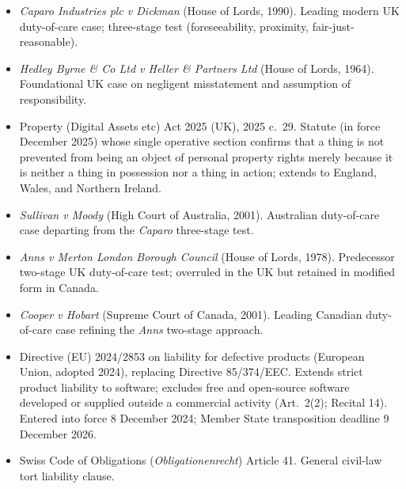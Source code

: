 \documentclass[11pt, twoside, openright]{book}
\begin{document}
\begin{itemize}[leftmargin=1.5em, itemsep=4pt]
  \item \textit{Caparo Industries plc v Dickman} (House of Lords, 1990). Leading modern UK duty-of-care case; three-stage test (foreseeability, proximity, fair-just-reasonable).
  \item \textit{Hedley Byrne \& Co Ltd v Heller \& Partners Ltd} (House of Lords, 1964). Foundational UK case on negligent misstatement and assumption of responsibility.
  \item Property (Digital Assets etc) Act 2025 (UK), 2025 c.~29. Statute (in force December 2025) whose single operative section confirms that a thing is not prevented from being an object of personal property rights merely because it is neither a thing in possession nor a thing in action; extends to England, Wales, and Northern Ireland.
  \item \textit{Sullivan v Moody} (High Court of Australia, 2001). Australian duty-of-care case departing from the \textit{Caparo} three-stage test.
  \item \textit{Anns v Merton London Borough Council} (House of Lords, 1978). Predecessor two-stage UK duty-of-care test; overruled in the UK but retained in modified form in Canada.
  \item \textit{Cooper v Hobart} (Supreme Court of Canada, 2001). Leading Canadian duty-of-care case refining the \textit{Anns} two-stage approach.
  \item Directive (EU) 2024/2853 on liability for defective products (European Union, adopted 2024), replacing Directive 85/374/EEC. Extends strict product liability to software; excludes free and open-source software developed or supplied outside a commercial activity (Art.~2(2); Recital 14). Entered into force 8 December 2024; Member State transposition deadline 9 December 2026.
  \item Swiss Code of Obligations (\textit{Obligationenrecht}) Article 41. General civil-law tort liability clause.
\end{itemize}
\end{document}
